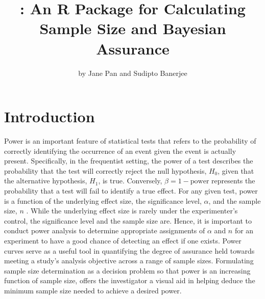 \title{: An R Package for Calculating Sample Size and Bayesian Assurance}
\author{by Jane Pan and Sudipto Banerjee}

\maketitle


\section{Introduction}\label{introduction}

Power is an important feature of statistical tests that refers to the probability of correctly identifying the occurrence of an event given the event is actually present. %
Specifically, in the frequentist setting, the power of a test describes the probability that the test will correctly reject the null hypothesis, $H_0$, given that the alternative hypothesis, $H_1$,  is true. Conversely, $\beta = 1 - \text{power}$ represents the probability that a test will fail to identify a true effect. For any given test, power is a function of the underlying effect size, the significance level, $\alpha$, and the sample size, $n$ . While the underlying effect size is rarely under the experimenter's control, the significance level and the sample size are. Hence, it is important to conduct power analysis to determine appropriate assignments of $\alpha$ and $n$  for an experiment to have a good chance of detecting an effect if one exists. 
Power curves serve as a useful tool in quantifying the degree of assurance held towards meeting a study's analysis objective across a range of sample sizes. Formulating sample size determination as a decision problem so that power is an increasing function of sample size, offers the investigator a visual aid in helping deduce the minimum sample size needed to achieve a desired power. 


